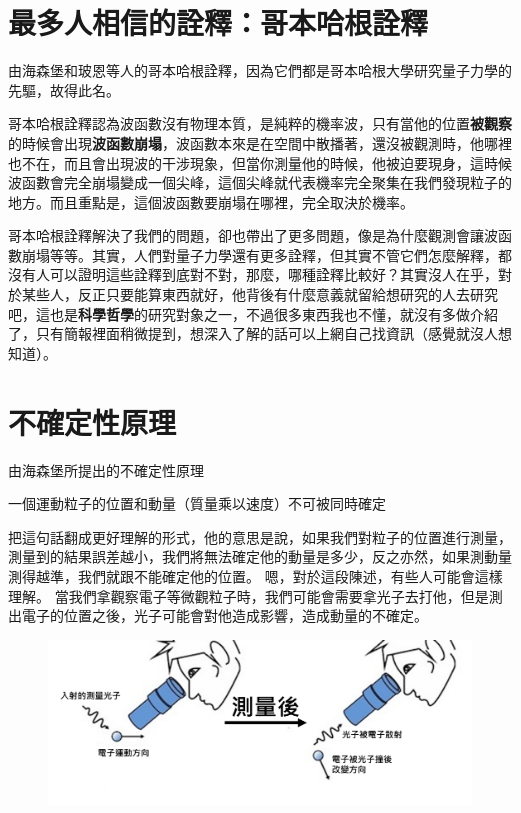 \section{最多人相信的詮釋：哥本哈根詮釋}
由海森堡和玻恩等人的哥本哈根詮釋，因為它們都是哥本哈根大學研究量子力學的先驅，故得此名。

哥本哈根詮釋認為波函數沒有物理本質，是純粹的機率波，只有當他的位置\textbf{被觀察}的時候會出現\textbf{波函數崩塌}，波函數本來是在空間中散播著，還沒被觀測時，他哪裡也不在，而且會出現波的干涉現象，但當你測量他的時候，他被迫要現身，這時候波函數會完全崩塌變成一個尖峰，這個尖峰就代表機率完全聚集在我們發現粒子的地方。而且重點是，這個波函數要崩塌在哪裡，完全取決於機率。

哥本哈根詮釋解決了我們的問題，卻也帶出了更多問題，像是為什麼觀測會讓波函數崩塌等等。其實，人們對量子力學還有更多詮釋，但其實不管它們怎麼解釋，都沒有人可以證明這些詮釋到底對不對，那麼，哪種詮釋比較好？其實沒人在乎，對於某些人，反正只要能算東西就好，他背後有什麼意義就留給想研究的人去研究吧，這也是\textbf{科學哲學}的研究對象之一，不過很多東西我也不懂，就沒有多做介紹了，只有簡報裡面稍微提到，想深入了解的話可以上網自己找資訊（感覺就沒人想知道）。

\section{不確定性原理}
由海森堡所提出的不確定性原理

\begin{center}
\noindent
{\Kai 一個運動粒子的位置和動量（質量乘以速度）不可被同時確定}
\end{center}

把這句話翻成更好理解的形式，他的意思是說，如果我們對粒子的位置進行測量，測量到的結果誤差越小，我們將無法確定他的動量是多少，反之亦然，如果測動量測得越準，我們就跟不能確定他的位置。
嗯，對於這段陳述，有些人可能會這樣理解。
當我們拿觀察電子等微觀粒子時，我們可能會需要拿光子去打他，但是測出電子的位置之後，光子可能會對他造成影響，造成動量的不確定。
\begin{figure}[H]
\centering
\graphicspath{{physics/}}
\includegraphics[width=\linewidth]{uncertainty-principle.png}
\label{fig:uncertainty-principle}
\end{figure}

